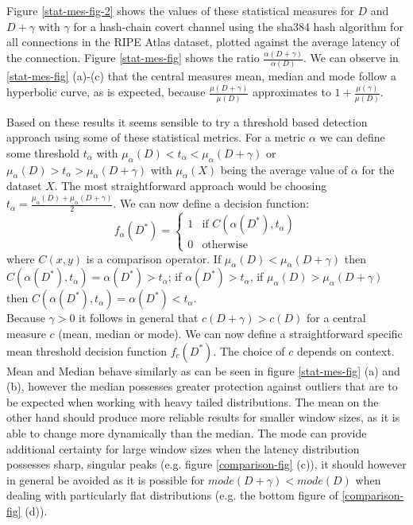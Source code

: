 \documentclass[12pt,a4paper,automark, toc=bib]{scrreprt}
\theoremstyle{definition}
\begin{document}
			Figure \ref{stat-mes-fig-2} shows the values of these statistical measures for $D$ and $D + \gamma$ with $\gamma$ for a hash-chain covert channel using the sha384 hash algorithm for all connections in the RIPE Atlas dataset, plotted against the average latency of the connection. Figure \ref{stat-mes-fig} shows the ratio $\frac{\alpha(D + \gamma)}{\alpha(D)}$.
			We can observe in \ref{stat-mes-fig} (a)-(c) that the central measures mean, median and mode follow a hyperbolic curve, as is expected, because $\frac{\mu(D + \gamma)}{\mu(D)}$ approximates to $1 + \frac{\mu(\gamma)}{\mu(D)}$.
			
			\pagebreak
			
			Based on these results it seems sensible to try a threshold based detection approach using some of these statistical metrics. For a metric $\alpha$ we can define some threshold $t_\alpha$ with $\mu_\alpha(D) < t_\alpha < \mu_\alpha(D+\gamma)$ or $\mu_\alpha(D) > t_\alpha > \mu_\alpha(D+\gamma)$ with $\mu_\alpha(X)$ being the average value of $\alpha$ for the dataset $X$. The most straightforward approach would be choosing $t_\alpha = \frac{\mu_\alpha(D) + \mu_\alpha(D + \gamma)}{2}$. We can now define a decision function:
			\begin{equation}
				\label{thresh-equ}
				f_\alpha(D^*) = 
				\begin{cases}
					1 & \text{if } C(\alpha(D^*), t_\alpha) \\
					0 & \text{otherwise}
				\end{cases}
			\end{equation} 
			where $C(x, y)$ is a comparison operator. If $\mu_\alpha(D) < \mu_\alpha(D + \gamma)$ then $C(\alpha(D^*), t_\alpha) = \alpha(D^*) > t_\alpha$; if $\alpha(D^*) > t_\alpha$, if $\mu_\alpha(D) > \mu_\alpha(D + \gamma)$ then $C(\alpha(D^*), t_\alpha) = \alpha(D^*) < t_\alpha$. \\
			Because $\gamma > 0$ it follows in general that $c(D + \gamma) > c(D)$ for a central measure $c$ (mean, median or mode). We can now define a straightforward specific mean threshold decision function $f_c(D^*)$. The choice of $c$ depends on context. Mean and Median behave similarly as can be seen in figure \ref{stat-mes-fig} (a) and (b), however the median possesses greater protection against outliers that are to be expected when working with heavy tailed distributions. The mean on the other hand should produce more reliable results for smaller window sizes, as it is able to change more dynamically than the median. The mode can provide additional certainty for large window sizes when the latency distribution possesses sharp, singular peaks (e.g. figure \ref{comparison-fig} (c)), it should however in general be avoided as it is possible for $mode(D+\gamma) < mode(D)$ when dealing with particularly flat distributions (e.g. the bottom figure of \ref{comparison-fig} (d)). \\
\end{document}
